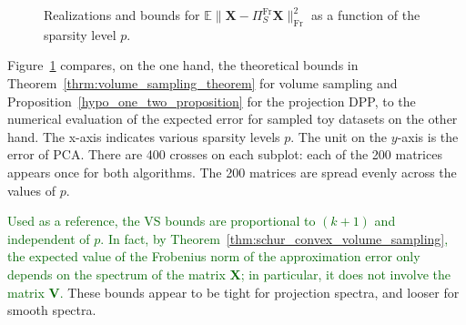 \documentclass[twoside,11pt]{book}
\newcommand{\rev}[1]{\textcolor{darkgreen}{#1}}
\numberwithin{theorem}{chapter}
\numberwithin{definition}{chapter}
\numberwithin{proposition}{chapter}
\numberwithin{corollary}{chapter}
\numberwithin{example}{chapter}
\numberwithin{lemma}{chapter}
\DeclareMathOperator{\Fr}{\mathrm{Fr}}
\begin{document}
\begin{figure}
 \setcounter{subfigure}{2}%
 \setcounter{subfigure}{5}%

\caption{Realizations and bounds for $\mathbb{E} \|\bm{X}- \Pi_{S}^{\Fr} \bm{X}\|_{\Fr}^{2}$ as a function of the sparsity level $p$. \label{fig:toydatasets_vs_dpp_comparison_0}}
\end{figure}


Figure~\ref{fig:toydatasets_vs_dpp_comparison_0} compares, on the one hand, the theoretical bounds in Theorem~\ref{thrm:volume_sampling_theorem} for volume sampling and Proposition~\ref{hypo_one_two_proposition} for the projection DPP, to the numerical evaluation of the expected error for sampled toy datasets on the other hand. The x-axis indicates various sparsity levels $p$. The unit on the $y$-axis is the error of PCA. There are 400 crosses on each subplot: each of the 200 matrices appears once for both algorithms. The 200 matrices are spread evenly across the values of $p$.

\rev{Used as a reference, the VS bounds are proportional to $(k+1)$ and independent of $p$. In fact, by Theorem~\ref{thm:schur_convex_volume_sampling}, the expected value of the Frobenius norm of the approximation error only depends on the spectrum of the matrix $\bm{X}$; in particular, it does not involve the matrix $\bm{V}$.} These bounds appear to be tight for projection spectra, and looser for smooth spectra.
\end{document}
